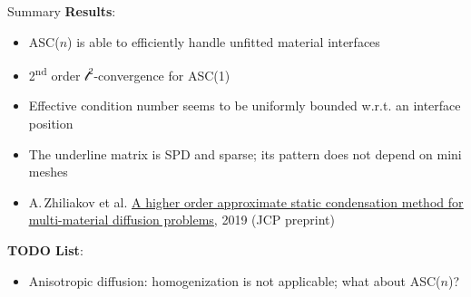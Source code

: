 \documentclass[svgnames]{beamer} %
\newcommand{\lTwo}{{\mathcal l^2}}
\begin{document}
	\begin{frame}{Summary}
		\textbf{Results}:
		\begin{itemize}
			\item ASC($n$) is able to efficiently handle unfitted material interfaces 
			\item 2\textsuperscript{nd} order $\lTwo$-convergence for ASC(1) 
			\item Effective condition number seems to be uniformly bounded w.r.t. an interface position
			\item The underline matrix is SPD and sparse; its pattern does not depend on mini\,meshes
			\item A.\,Zhiliakov et al. \href{https://www.researchgate.net/publication/330912268_A_higher_order_approximate_static_condensation_method_for_multi-material_diffusion_problems}{\ul{A higher order approximate static condensation method for multi-material diffusion problems}}, 2019 (JCP preprint)
		\end{itemize}
		\textbf{TODO List}:
		\begin{itemize}
			\item Anisotropic diffusion: homogenization is not applicable; what about ASC($n$)? 
		\end{itemize}
	\end{frame}
\end{document}
